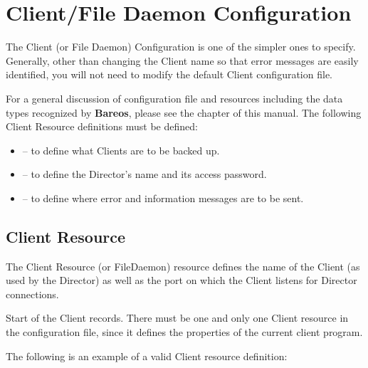 
\chapter{Client/File Daemon Configuration}
\label{FiledConfChapter}

The Client (or File Daemon) Configuration is one of the simpler ones to
specify. Generally, other than changing the Client name so that error messages
are easily identified, you will not need to modify the default Client
configuration file.

For a general discussion of configuration file and resources including the
data types recognized by {\bf Bareos}, please see the
 chapter of this manual. The
following Client Resource definitions must be defined:

\begin{itemize}
\item
    -- to define what Clients are  to
   be backed up.
\item
    -- to  define the Director's
   name and its access password.
\item
    -- to define where error  and
   information messages are to be sent.
\end{itemize}

\section{Client Resource}
\label{ClientResource}

The Client Resource (or FileDaemon) resource defines the name of the Client
(as used by the Director) as well as the port on which the Client listens for
Director connections.

Start of the Client records.  There must be one and only one Client resource
in the  configuration file, since it defines the properties of the  current
client program.





The following is an example of a valid Client resource definition:

